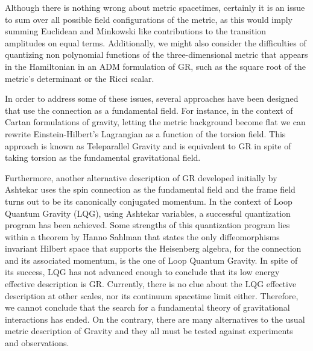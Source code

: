 \documentclass[twocolumn,
  showpacs,showkeys,prd,superscriptaddress]{revtex4-1}
\begin{document}
Although there is nothing wrong about metric spacetimes,  certainly it is an issue to sum over all possible field configurations of the metric, as this would imply summing Euclidean and Minkowski like contributions to the transition amplitudes on equal terms. Additionally, we might also consider the difficulties of  quantizing  non polynomial functions of the three-dimensional metric that appears in the Hamiltonian in an ADM formulation of GR, such as the square root of the metric's determinant or the Ricci scalar.

In order to address some of these issues, several approaches have been designed that use the connection as a fundamental field. For instance, in the context of Cartan formulations of gravity, letting the metric background become flat we can rewrite Einstein-Hilbert's Lagrangian as a function of the torsion field. This approach is known as Teleparallel Gravity and is equivalent to GR in spite of taking torsion as the fundamental gravitational field.

Furthermore, another alternative description of GR developed initially by Ashtekar uses the spin connection as the fundamental field and the frame field turns out to be its canonically conjugated momentum. In the context of Loop Quantum Gravity (LQG), using Ashtekar variables, a successful quantization program has been achieved. Some  strengths of this quantization program lies within a theorem by Hanno Sahlman that states the only diffeomorphisms invariant Hilbert space that supports the Heisenberg algebra, for the connection and its associated momentum, is the one of Loop Quantum Gravity. In spite of its success, LQG has not advanced enough to conclude that its low energy effective description is GR. Currently, there is no clue about the LQG effective description at other scales,  nor its continuum spacetime limit either. Therefore, we cannot conclude that the search for a fundamental theory of gravitational interactions has ended. On the contrary, there are many alternatives to the usual metric description of Gravity and they all must be tested against experiments and observations.
\end{document}

